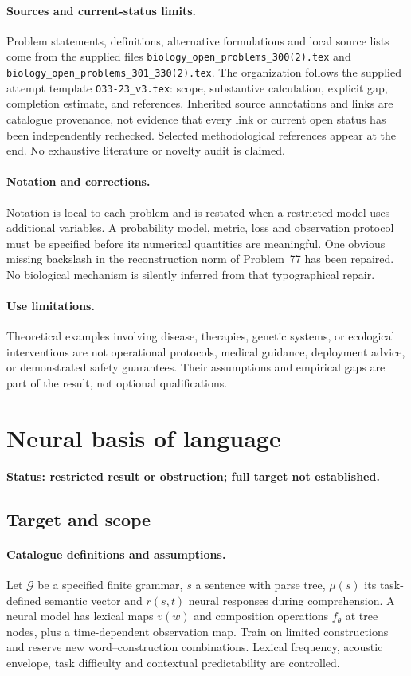 \documentclass[11pt]{article}
\begin{document}
\paragraph{Sources and current-status limits.}
Problem statements, definitions, alternative formulations and local source lists
come from the supplied files
\texttt{biology\_open\_problems\_300(2).tex} and
\texttt{biology\_open\_problems\_301\_330(2).tex}.
The organization follows the supplied attempt template
\texttt{O33-23\_v3.tex}: scope, substantive calculation, explicit gap,
completion estimate, and references. Inherited source annotations and links are
catalogue provenance, not evidence that every link or current open status has
been independently rechecked. Selected methodological references appear at the
end. No exhaustive literature or novelty audit is claimed.

\paragraph{Notation and corrections.}
Notation is local to each problem and is restated when a restricted model uses
additional variables. A probability model, metric, loss and observation protocol
must be specified before its numerical quantities are meaningful. One obvious
missing backslash in the reconstruction norm of Problem~77 has been repaired.
No biological mechanism is silently inferred from that typographical repair.

\paragraph{Use limitations.}
Theoretical examples involving disease, therapies, genetic systems, or ecological
interventions are not operational protocols, medical guidance, deployment advice,
or demonstrated safety guarantees. Their assumptions and empirical gaps are part
of the result, not optional qualifications.


\section*{Neural basis of language}
\label{prob:117}
\noindent\textbf{Status: restricted result or obstruction; full target not established.}
\subsection{Target and scope}
\paragraph{Catalogue definitions and assumptions.}
Let $\mathcal G$ be a specified finite grammar, $s$ a sentence with parse tree, $\mu(s)$ its task-defined semantic vector and $r(s,t)$ neural responses during comprehension. A neural model has lexical maps $v(w)$ and composition operations $f_\theta$ at tree nodes, plus a time-dependent observation map. Train on limited constructions and reserve new word--construction combinations. Lexical frequency, acoustic envelope, task difficulty and contextual predictability are controlled.
\end{document}
